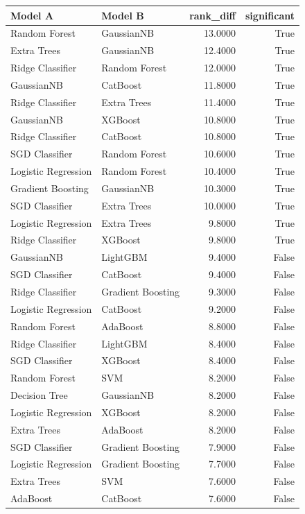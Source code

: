 \begin{tabular}{llrr}
\toprule
Model A & Model B & rank\_diff & significant \\
\midrule
Random Forest & GaussianNB & 13.0000 & True \\
Extra Trees & GaussianNB & 12.4000 & True \\
Ridge Classifier & Random Forest & 12.0000 & True \\
GaussianNB & CatBoost & 11.8000 & True \\
Ridge Classifier & Extra Trees & 11.4000 & True \\
GaussianNB & XGBoost & 10.8000 & True \\
Ridge Classifier & CatBoost & 10.8000 & True \\
SGD Classifier & Random Forest & 10.6000 & True \\
Logistic Regression & Random Forest & 10.4000 & True \\
Gradient Boosting & GaussianNB & 10.3000 & True \\
SGD Classifier & Extra Trees & 10.0000 & True \\
Logistic Regression & Extra Trees & 9.8000 & True \\
Ridge Classifier & XGBoost & 9.8000 & True \\
GaussianNB & LightGBM & 9.4000 & False \\
SGD Classifier & CatBoost & 9.4000 & False \\
Ridge Classifier & Gradient Boosting & 9.3000 & False \\
Logistic Regression & CatBoost & 9.2000 & False \\
Random Forest & AdaBoost & 8.8000 & False \\
Ridge Classifier & LightGBM & 8.4000 & False \\
SGD Classifier & XGBoost & 8.4000 & False \\
Random Forest & SVM & 8.2000 & False \\
Decision Tree & GaussianNB & 8.2000 & False \\
Logistic Regression & XGBoost & 8.2000 & False \\
Extra Trees & AdaBoost & 8.2000 & False \\
SGD Classifier & Gradient Boosting & 7.9000 & False \\
Logistic Regression & Gradient Boosting & 7.7000 & False \\
Extra Trees & SVM & 7.6000 & False \\
AdaBoost & CatBoost & 7.6000 & False \\

\end{tabular}
